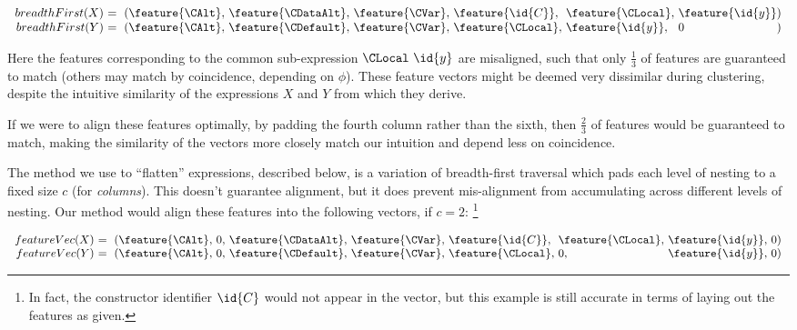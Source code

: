 \begin{small}
  \begin{equation}
    \begin{array}{r@{}l@{}l@{}l@{}l@{}l@{}l@{}l}
      breadthFirst(X)\ &=\ (\feature{\CAlt},\ &\feature{\CDataAlt},\ &\feature{\CVar},\ &\feature{\id{C}},\ &\feature{\CLocal},\ &\feature{\id{y}} &) \\
      breadthFirst(Y)\ &=\ (\feature{\CAlt},\ &\feature{\CDefault},\ &\feature{\CVar},\ &\feature{\CLocal},\ &\feature{\id{y}},\ &0 &)
    \end{array}
  \end{equation}
\end{small}

Here the features corresponding to the common sub-expression $\CLocal\ \id{y}$ are misaligned, such that only $\frac{1}{3}$ of features are guaranteed to match (others may match by coincidence, depending on $\phi$). These feature vectors might be deemed very dissimilar during clustering, despite the intuitive similarity of the expressions $X$ and $Y$ from which they derive.

If we were to align these features optimally, by padding the fourth column rather than the sixth, then $\frac{2}{3}$ of features would be guaranteed to match, making the similarity of the vectors more closely match our intuition and depend less on coincidence.

The method we use to ``flatten'' expressions, described below, is a variation of breadth-first traversal which pads each level of nesting to a fixed size $c$ (for \emph{columns}). This doesn't guarantee alignment, but it does prevent mis-alignment from accumulating across different levels of nesting. Our method would align these features into the following vectors, if $c = 2$: \footnote{In fact, the constructor identifier $\id{C}$ would not appear in the vector, but this example is still accurate in terms of laying out the features as given.}

\begin{small}
  \begin{equation}\label{eq:flattened}
    \begin{array}{r@{}l@{}l@{}l@{}l@{}l@{}l@{}l@{}l@{}l}
      featureVec(X)\ &=\ (\feature{\CAlt},\ &0,\ &\feature{\CDataAlt},\ &\feature{\CVar},\ &\feature{\id{C}},\  &\feature{\CLocal},\ &\feature{\id{y}},\ &0 &) \\
      featureVec(Y)\ &=\ (\feature{\CAlt},\ &0,\ &\feature{\CDefault},\ &\feature{\CVar},\ &\feature{\CLocal},\ &0,\                 &\feature{\id{y}},\ &0 &)
    \end{array}
  \end{equation}
\end{small}

